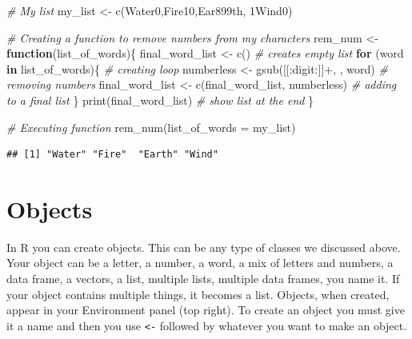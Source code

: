 \documentclass[
]{book}
\newenvironment{Shaded}{\begin{snugshade}}{\end{snugshade}}
\newcommand{\AttributeTok}[1]{\textcolor[rgb]{0.77,0.63,0.00}{#1}}
\newcommand{\CommentTok}[1]{\textcolor[rgb]{0.56,0.35,0.01}{\textit{#1}}}
\newcommand{\ControlFlowTok}[1]{\textcolor[rgb]{0.13,0.29,0.53}{\textbf{#1}}}
\newcommand{\FunctionTok}[1]{\textcolor[rgb]{0.00,0.00,0.00}{#1}}
\newcommand{\NormalTok}[1]{#1}
\newcommand{\OtherTok}[1]{\textcolor[rgb]{0.56,0.35,0.01}{#1}}
\newcommand{\StringTok}[1]{\textcolor[rgb]{0.31,0.60,0.02}{#1}}
\begin{document}
\begin{Shaded}
\begin{Highlighting}[]
\CommentTok{\# My list}
\NormalTok{my\_list }\OtherTok{\textless{}{-}} \FunctionTok{c}\NormalTok{(}\StringTok{\textquotesingle{}Water0\textquotesingle{}}\NormalTok{,}\StringTok{\textquotesingle{}Fire10\textquotesingle{}}\NormalTok{,}\StringTok{\textquotesingle{}Ear899th\textquotesingle{}}\NormalTok{, }\StringTok{\textquotesingle{}1Wind0\textquotesingle{}}\NormalTok{)}

\CommentTok{\# Creating a function to remove numbers from my characters}
\NormalTok{rem\_num }\OtherTok{\textless{}{-}} \ControlFlowTok{function}\NormalTok{(list\_of\_words)\{}
\NormalTok{  final\_word\_list }\OtherTok{\textless{}{-}} \FunctionTok{c}\NormalTok{()  }\CommentTok{\# creates empty list}
  \ControlFlowTok{for}\NormalTok{ (word }\ControlFlowTok{in}\NormalTok{ list\_of\_words)\{  }\CommentTok{\# creating loop}
\NormalTok{    numberless }\OtherTok{\textless{}{-}} \FunctionTok{gsub}\NormalTok{(}\StringTok{\textquotesingle{}[[:digit:]]+\textquotesingle{}}\NormalTok{, }\StringTok{\textquotesingle{}\textquotesingle{}}\NormalTok{, word)  }\CommentTok{\# removing numbers}
\NormalTok{    final\_word\_list }\OtherTok{\textless{}{-}} \FunctionTok{c}\NormalTok{(final\_word\_list, numberless)  }\CommentTok{\# adding to a final list}
\NormalTok{  \}}
  \FunctionTok{print}\NormalTok{(final\_word\_list) }\CommentTok{\# show list at the end}
\NormalTok{\}}

\CommentTok{\# Executing function}
\FunctionTok{rem\_num}\NormalTok{(}\AttributeTok{list\_of\_words =}\NormalTok{ my\_list)}
\end{Highlighting}
\end{Shaded}

\begin{verbatim}
## [1] "Water" "Fire"  "Earth" "Wind"
\end{verbatim}

\hypertarget{objects}{%
\section{Objects}\label{objects}}

In R you can create objects.
This can be any type of classes we discussed above.
Your object can be a letter, a number, a word, a mix of letters and numbers, a data frame, a vectors, a list, multiple lists, multiple data frames, you name it.
If your object contains multiple things, it becomes a list.
Objects, when created, appear in your Environment panel (top right).
To create an object you must give it a name and then you use \texttt{\textless{}-} followed by whatever you want to make an object.\\
\end{document}
